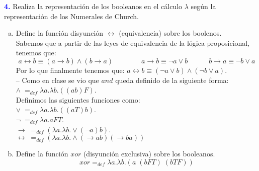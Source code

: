 \textbf{\textcolor{blue}{4.}}\Large
Realiza la representación de los booleanos en el cálculo
$\lambda$ según la representación de los Numerales de Church.
\begin{enumerate}[a)]
    \item Define la función disyunción $\leftrightarrow$ (equivalencia) sobre los boolenos.\\
    Sabemos que a partir de las leyes de equivalencia de la lógica proposicional, tenemos que:
    \begin{equation*}
        a \leftrightarrow b \equiv (a \rightarrow b) \land (b \rightarrow a)\quad \quad \quad \quad
            a \rightarrow b \equiv \neg a \lor b \quad \quad \quad
            b \rightarrow a \equiv \neg b \lor a
        \end{equation*}
        Por lo que finalmente tenemos que:
        $a \leftrightarrow b \equiv (\neg a \lor b) \land (\neg b \lor a )$.\\

        -- Como en clase se vio que $and$ queda definido de la siguiente forma:\\
        $\land \; =_{def} \lambda a. \lambda b.((ab)F)$.\\
        Definimos las siguientes funciones como:\\
        $\lor \; =_{def} \lambda a.\lambda b. ((aT)b)$.\\
        $\neg \; =_{def} \lambda a.aFT$.\\
        $\rightarrow \; =_{def}(\lambda a.\lambda b.\lor (\neg a)b)$.\\
        $\leftrightarrow \;
        =_{def} (\lambda a. \lambda b. \land(\rightarrow ab)(\rightarrow ba))$
    \item Define la función $xor$ (disyunción exclusiva) sobre los booleanos.
    \begin{equation*}
            xor =_{def} \lambda a. \lambda b.(a \; (bFT) \; (bTF))
        \end{equation*}
\end{enumerate}
